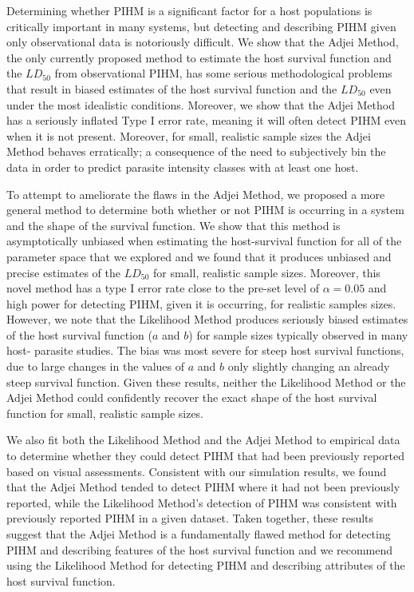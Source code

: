 \documentclass[12pt, a4paper]{article}
\begin{document}
Determining whether PIHM is a significant factor for a host populations is critically important in many systems, but detecting and describing PIHM given only observational data is
notoriously difficult.  We show that the Adjei Method, the only currently
proposed method to estimate the host survival function and the $LD_{50}$ from
observational PIHM, has some serious methodological problems that result in
biased estimates of the host survival function and the $LD_{50}$ even under the most idealistic conditions.  Moreover, we show that the Adjei Method has a seriously inflated Type I error rate, meaning it will often detect PIHM even when it is not present. Moreover, for small, realistic sample sizes the Adjei Method behaves erratically; a consequence of the need to subjectively bin the data in order to predict parasite intensity classes with at least one host.

To attempt to ameliorate the flaws in the Adjei Method, we proposed a more
general method to determine both whether or not PIHM is occurring in a system
and the shape of the survival function.  We show that this method is
asymptotically unbiased when estimating the host-survival function for all of
the parameter space that we explored and we found that it produces unbiased and
precise estimates of the $LD_{50}$ for small, realistic sample sizes. Moreover,
this novel method has a type I error rate close to the pre-set level of $\alpha = 0.05$ and high power for detecting PIHM, given it is occurring, for realistic samples sizes.
  However, we note that
the Likelihood Method produces seriously biased estimates of the host survival
function ($a$ and $b$) for sample sizes typically observed in many host-
parasite studies.  The bias was most severe for steep host survival functions,
due to large changes in the values of $a$ and $b$ only slightly changing an
already steep survival function.  Given these results, neither the
Likelihood Method or the Adjei Method could confidently recover the exact shape of the host survival function for small, realistic sample sizes.

We also fit both the Likelihood Method and the Adjei Method to empirical data to
determine whether they could detect PIHM that had been previously reported
based on visual assessments.  Consistent with our simulation results, we found
that the Adjei Method tended to detect PIHM where it had not been previously
reported, while the Likelihood Method's detection of PIHM was consistent with
previously reported PIHM in a given dataset.  Taken together, these results suggest that the Adjei Method is a fundamentally
flawed method for detecting PIHM and describing features of the host survival
function and we recommend using the Likelihood Method for detecting PIHM and describing attributes of the host survival function.
\end{document}
